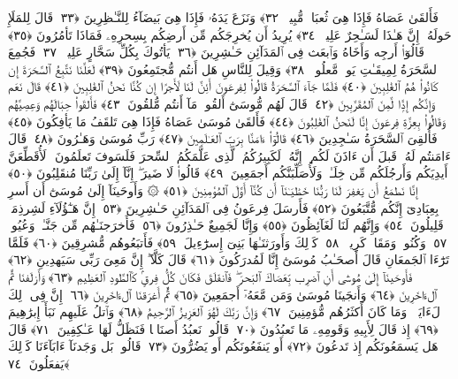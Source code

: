  فَأَلقَىٰ عَصَاهُ فَإِذَا هِىَ ثُعبَانٌۭ مُّبِينٌۭ ﴿٣٢﴾
 وَنَزَعَ يَدَهُۥ فَإِذَا هِىَ بَيضَآءُ لِلنَّـٰظِرِينَ ﴿٣٣﴾
 قَالَ لِلمَلَإِ حَولَهُۥٓ إِنَّ هَـٰذَا لَسَـٰحِرٌ عَلِيمٌۭ ﴿٣٤﴾
 يُرِيدُ أَن يُخرِجَكُم مِّن أَرضِكُم بِسِحرِهِۦ فَمَاذَا تَأمُرُونَ ﴿٣٥﴾
 قَالُوٓا۟ أَرجِه وَأَخَاهُ وَٱبعَث فِى ٱلمَدَآئِنِ حَـٰشِرِينَ ﴿٣٦﴾
 يَأتُوكَ بِكُلِّ سَحَّارٍ عَلِيمٍۢ ﴿٣٧﴾
 فَجُمِعَ ٱلسَّحَرَةُ لِمِيقَـٰتِ يَومٍۢ مَّعلُومٍۢ ﴿٣٨﴾
 وَقِيلَ لِلنَّاسِ هَل أَنتُم مُّجتَمِعُونَ ﴿٣٩﴾
 لَعَلَّنَا نَتَّبِعُ ٱلسَّحَرَةَ إِن كَانُوا۟ هُمُ ٱلغَٰلِبِينَ ﴿٤٠﴾
 فَلَمَّا جَآءَ ٱلسَّحَرَةُ قَالُوا۟ لِفِرعَونَ أَئِنَّ لَنَا لَأَجرًا إِن كُنَّا نَحنُ ٱلغَٰلِبِينَ ﴿٤١﴾
 قَالَ نَعَم وَإِنَّكُم إِذًۭا لَّمِنَ ٱلمُقَرَّبِينَ ﴿٤٢﴾
 قَالَ لَهُم مُّوسَىٰٓ أَلقُوا۟ مَآ أَنتُم مُّلقُونَ ﴿٤٣﴾
 فَأَلقَوا۟ حِبَالَهُم وَعِصِيَّهُم وَقَالُوا۟ بِعِزَّةِ فِرعَونَ إِنَّا لَنَحنُ ٱلغَٰلِبُونَ ﴿٤٤﴾
 فَأَلقَىٰ مُوسَىٰ عَصَاهُ فَإِذَا هِىَ تَلقَفُ مَا يَأفِكُونَ ﴿٤٥﴾
 فَأُلقِىَ ٱلسَّحَرَةُ سَـٰجِدِينَ ﴿٤٦﴾
 قَالُوٓا۟ ءَامَنَّا بِرَبِّ ٱلعَـٰلَمِينَ ﴿٤٧﴾
 رَبِّ مُوسَىٰ وَهَـٰرُونَ ﴿٤٨﴾
 قَالَ ءَامَنتُم لَهُۥ قَبلَ أَن ءَاذَنَ لَكُم ۖ إِنَّهُۥ لَكَبِيرُكُمُ ٱلَّذِى عَلَّمَكُمُ ٱلسِّحرَ فَلَسَوفَ تَعلَمُونَ ۚ لَأُقَطِّعَنَّ أَيدِيَكُم وَأَرجُلَكُم مِّن خِلَـٰفٍۢ وَلَأُصَلِّبَنَّكُم أَجمَعِينَ ﴿٤٩﴾
 قَالُوا۟ لَا ضَيرَ ۖ إِنَّآ إِلَىٰ رَبِّنَا مُنقَلِبُونَ ﴿٥٠﴾
 إِنَّا نَطمَعُ أَن يَغفِرَ لَنَا رَبُّنَا خَطَٰيَـٰنَآ أَن كُنَّآ أَوَّلَ ٱلمُؤمِنِينَ ﴿٥١﴾
 ۞ وَأَوحَينَآ إِلَىٰ مُوسَىٰٓ أَن أَسرِ بِعِبَادِىٓ إِنَّكُم مُّتَّبَعُونَ ﴿٥٢﴾
 فَأَرسَلَ فِرعَونُ فِى ٱلمَدَآئِنِ حَـٰشِرِينَ ﴿٥٣﴾
 إِنَّ هَـٰٓؤُلَآءِ لَشِرذِمَةٌۭ قَلِيلُونَ ﴿٥٤﴾
 وَإِنَّهُم لَنَا لَغَآئِظُونَ ﴿٥٥﴾
 وَإِنَّا لَجَمِيعٌ حَـٰذِرُونَ ﴿٥٦﴾
 فَأَخرَجنَـٰهُم مِّن جَنَّـٰتٍۢ وَعُيُونٍۢ ﴿٥٧﴾
 وَكُنُوزٍۢ وَمَقَامٍۢ كَرِيمٍۢ ﴿٥٨﴾
 كَذَٟلِكَ وَأَورَثنَـٰهَا بَنِىٓ إِسرَٰٓءِيلَ ﴿٥٩﴾
 فَأَتبَعُوهُم مُّشرِقِينَ ﴿٦٠﴾
 فَلَمَّا تَرَٰٓءَا ٱلجَمعَانِ قَالَ أَصحَـٰبُ مُوسَىٰٓ إِنَّا لَمُدرَكُونَ ﴿٦١﴾
 قَالَ كَلَّآ ۖ إِنَّ مَعِىَ رَبِّى سَيَهدِينِ ﴿٦٢﴾
 فَأَوحَينَآ إِلَىٰ مُوسَىٰٓ أَنِ ٱضرِب بِّعَصَاكَ ٱلبَحرَ ۖ فَٱنفَلَقَ فَكَانَ كُلُّ فِرقٍۢ كَٱلطَّودِ ٱلعَظِيمِ ﴿٦٣﴾
 وَأَزلَفنَا ثَمَّ ٱلءَاخَرِينَ ﴿٦٤﴾
 وَأَنجَينَا مُوسَىٰ وَمَن مَّعَهُۥٓ أَجمَعِينَ ﴿٦٥﴾
 ثُمَّ أَغرَقنَا ٱلءَاخَرِينَ ﴿٦٦﴾
 إِنَّ فِى ذَٟلِكَ لَءَايَةًۭ ۖ وَمَا كَانَ أَكثَرُهُم مُّؤمِنِينَ ﴿٦٧﴾
 وَإِنَّ رَبَّكَ لَهُوَ ٱلعَزِيزُ ٱلرَّحِيمُ ﴿٦٨﴾
 وَٱتلُ عَلَيهِم نَبَأَ إِبرَٰهِيمَ ﴿٦٩﴾
 إِذ قَالَ لِأَبِيهِ وَقَومِهِۦ مَا تَعبُدُونَ ﴿٧٠﴾
 قَالُوا۟ نَعبُدُ أَصنَامًۭا فَنَظَلُّ لَهَا عَـٰكِفِينَ ﴿٧١﴾
 قَالَ هَل يَسمَعُونَكُم إِذ تَدعُونَ ﴿٧٢﴾
 أَو يَنفَعُونَكُم أَو يَضُرُّونَ ﴿٧٣﴾
 قَالُوا۟ بَل وَجَدنَآ ءَابَآءَنَا كَذَٟلِكَ يَفعَلُونَ ﴿٧٤﴾
